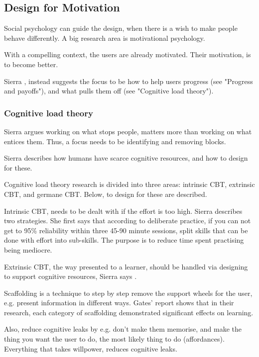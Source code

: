 \subsection{Design for Motivation}

Social psychology can guide the design, when there is a wish to make people behave differently. A big research area is motivational psychology.

With a compelling context, the users are already motivated. Their motivation, is to become better.

Sierra \cite{sierra}, instead suggests the focus to be how to help users progress (see "Progress and payoffs"), and what pulls them off (see "Cognitive load theory").

\subsubsection{Cognitive load theory}

Sierra argues working on what stops people, matters more than working on what entices them. Thus, a focus needs to be identifying and removing blocks.

Sierra \cite{sierra} describes how humans have scarce cognitive resources, and how to design for these.

Cognitive load theory research is divided into three areas: intrinsic CBT, extrinsic CBT, and germane CBT. Below, to design for these are described.

Intrinsic CBT, needs to be dealt with if the effort is too high. Sierra \cite{sierra}describes two strategies. She first says that according to deliberate practice, if you can not get to 95\% reliability within three 45-90 minute sessions, split skills that can be done with effort into sub-skills. The purpose is to reduce time spent practising being mediocre.

Extrinsic CBT, the way presented to a learner, should be handled via designing to support cognitive resources, Sierra says \cite{sierra}.

Scaffolding is a technique to step by step remove the support wheels for the user, e.g. present information in different ways. Gates' \cite{gates} report shows that in their research, each category of scaffolding demonstrated significant effects on learning.

Also, reduce cognitive leaks by e.g. don't make them memorise, and make the thing you want the user to do, the most likely thing to do (affordances). Everything that takes willpower, reduces cognitive leaks.

